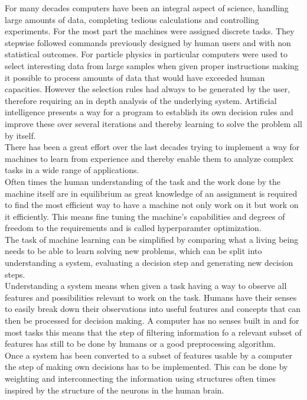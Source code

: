 For many decades computers have been an integral aspect of science, handling large amounts of data, completing tedious calculations and controlling experiments. For the most part the  machines were assigned discrete tasks. They stepwise followed commands previously designed by human users and with non statistical outcomes. 
For particle physics in particular computers were used to select interesting data from large samples when given proper instructions making it possible to process amounts of data that would have exceeded human capacities. However the selection rules had always to be generated by the user, therefore requiring an in depth analysis of the underlying system. Artificial intelligence presents a way for a program to establish its own decision rules and improve these over several iterations and thereby learning to solve the problem all by itself.\\
There has been a great effort over the last decades trying to implement a way for machines to learn from experience and thereby enable them to analyze complex tasks in a wide range of applications.\\
Often times the human understanding of the task and the work done by the machine itself are in equilibrium as great knowledge of an assignment is required to find the most efficient way to have a machine not only work on it but work on it efficiently. This means fine tuning the machine's capabilities and degrees of freedom to the requirements and is called hyperparamter optimization.\\
The task of machine learning can be simplified by comparing what a living being needs to be able to learn solving new problems, which can be split into understanding a system, evaluating a decision step and generating new decision steps.\\
Understanding a system means when given a task having a way to observe all features and possibilities relevant to work on the task. Humans have their senses to easily break down their observations into useful features and concepts that can then be processed for decision making. A computer has no senses built in and for most tasks this means that the step of filtering information fo a relevant subset of features has still to be done by humans or a good preprocessing algorithm.\\
Once a system has been converted to a subset of features usable by a computer the step of making own decisions has to be implemented. This can be done by weighting and interconnecting the information using structures often times inspired by the structure of the neurons in the human brain.\\
